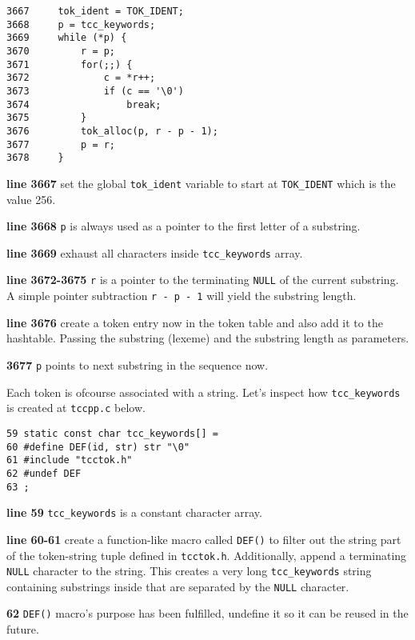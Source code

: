 \begin{verbatim}
3667     tok_ident = TOK_IDENT;
3668     p = tcc_keywords;
3669     while (*p) {
3670         r = p;
3671         for(;;) {
3672             c = *r++;
3673             if (c == '\0')
3674                 break;
3675         }
3676         tok_alloc(p, r - p - 1);
3677         p = r;
3678     }
\end{verbatim}

\begin{tcc_desc}
\textbf{line 3667} set the global \verb|tok_ident| variable to start at \verb|TOK_IDENT| which is the value 256.

\textbf{line 3668} \verb|p| is always used as a pointer to the first letter of a substring.

\textbf{line 3669} exhaust all characters inside \verb|tcc_keywords| array.

\textbf{line 3672-3675} \verb|r| is a pointer to the terminating \verb|NULL| of the current substring. A simple pointer subtraction \verb|r - p - 1| will yield the substring length.

\textbf{line 3676} create a token entry now in the token table and also add it to the hashtable. Passing the substring (lexeme) and the substring length as parameters.

\textbf{3677} \verb|p| points to next substring in the sequence now.

\end{tcc_desc}

Each token is ofcourse associated with a string. Let's inspect how \verb|tcc_keywords| is created at \verb|tccpp.c| below.

\begin{verbatim}
59 static const char tcc_keywords[] = 
60 #define DEF(id, str) str "\0"
61 #include "tcctok.h"
62 #undef DEF
63 ;
\end{verbatim}
\begin{tcc_desc}
\textbf{line 59} \verb|tcc_keywords| is a constant character array.

\textbf{line 60-61} create a function-like macro called \verb|DEF()| to filter out the string part of the token-string tuple defined in \verb|tcctok.h|. Additionally, append a terminating \verb|NULL| character to the string. This creates a very long \verb|tcc_keywords| string containing substrings inside that are separated by the \verb|NULL| character.

\textbf{62} \verb|DEF()| macro's purpose has been fulfilled, undefine it so it can be reused in the future.
\end{tcc_desc}

